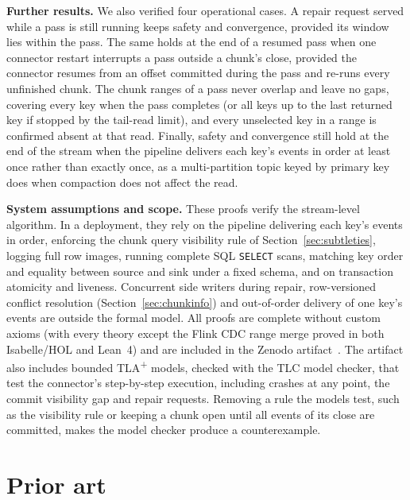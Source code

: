 \documentclass[sigconf,nonacm,10pt]{acmart}
\begin{document}
\textbf{Further results.} We also verified four operational cases. A repair request served while a pass is still running
keeps safety and convergence, provided its window lies within the pass. The same holds at the end of a resumed pass when one connector restart
interrupts a pass outside a chunk's close, provided the connector resumes from
an offset committed during the pass and re-runs every unfinished chunk. The chunk ranges of a pass never overlap and leave no gaps, covering
every key when the pass completes (or all keys up to the last returned key if
stopped by the tail-read limit), and every unselected key in a range is confirmed
absent at that read. Finally, safety and convergence still hold at the end of the stream when the pipeline
delivers each key's events in order at least once rather than exactly once, as a multi-partition topic keyed by primary key does when compaction does not
affect the read.

\textbf{System assumptions and scope.} These proofs verify the stream-level
algorithm. In a deployment, they rely on the pipeline delivering each key's events in
order, enforcing the chunk query visibility rule of
Section~\ref{sec:subtleties}, logging full row images, running complete SQL
\texttt{SELECT} scans, matching key order and equality between source and sink
under a fixed schema, and on transaction atomicity and liveness. Concurrent side writers during repair, row-versioned conflict resolution
(Section~\ref{sec:chunkinfo}) and out-of-order delivery of one key's events
are outside the formal model. All proofs are complete without custom axioms
(with every theory except the Flink CDC range merge proved in both Isabelle/HOL
and Lean~4) and are included in the Zenodo artifact~\cite{orphan_absence_artifact}.
The artifact also includes bounded TLA\textsuperscript{+} models, checked with
the TLC model checker, that test the connector's step-by-step execution,
including crashes at any point, the commit visibility gap and repair requests.
Removing a rule the models test, such as the visibility rule or keeping a chunk
open until all events of its close are committed, makes the model checker
produce a counterexample.

\section{Prior art}\label{sec:prior}
\end{document}
